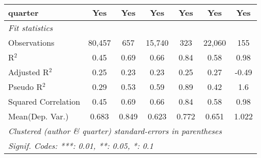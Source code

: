 \begin{tabular}{lcccccc}
   quarter                                                    & Yes         & Yes           & Yes           & Yes           & Yes         & Yes\\  
   \midrule
   \emph{Fit statistics}\\
   Observations                                               & 80,457      & 657           & 15,740        & 323           & 22,060      & 155\\  
   R$^2$                                                      & 0.45        & 0.69          & 0.66          & 0.84          & 0.58        & 0.98\\  
   Adjusted R$^2$                                             & 0.25        & 0.23          & 0.23          & 0.25          & 0.27        & -0.49\\  
   Pseudo R$^2$                                               & 0.29        & 0.53          & 0.59          & 0.89          & 0.42        & 1.6\\  
   Squared Correlation                                        & 0.45        & 0.69          & 0.66          & 0.84          & 0.58        & 0.98\\  
Mean(Dep. Var.) & 0.683 & 0.849 & 0.623 & 0.772 & 0.651 & 1.022 \\
   \midrule \midrule
   \multicolumn{7}{l}{\emph{Clustered (author \& quarter) standard-errors in parentheses}}\\
   \multicolumn{7}{l}{\emph{Signif. Codes: ***: 0.01, **: 0.05, *: 0.1}}\\
\end{tabular}
\par\endgroup

